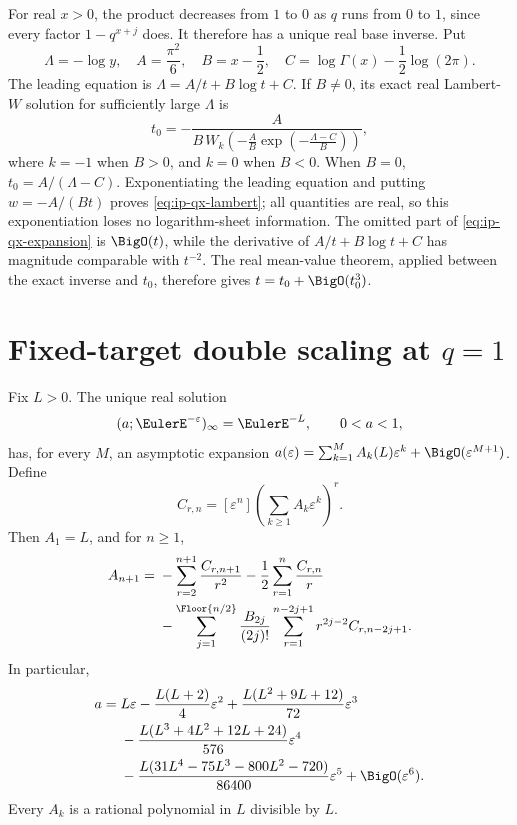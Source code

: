 For real \(x>0\), the product decreases from \(1\) to \(0\) as \(q\) runs from
\(0\) to \(1\), since every factor \(1-q^{x+j}\) does.  It therefore has a
unique real base inverse.  Put
\[
 \Lambda=-\log y,\quad A=\frac{\pi^2}{6},\quad
 B=x-\frac12,\quad C=\log\Gamma(x)-\frac12\log(2\pi).
\]
The leading equation is \(\Lambda=A/t+B\log t+C\).  If \(B\ne0\), its exact
real Lambert-\(W\) solution for sufficiently large \(\Lambda\) is
\begin{equation}
 t_0=-\frac{A}
 {B\,W_k\!\left(-\frac AB
 \exp\left(-\frac{\Lambda-C}{B}\right)\right)},
 \label{eq:ip-qx-lambert}
\end{equation}
where \(k=-1\) when \(B>0\), and \(k=0\) when \(B<0\).
When \(B=0\), \(t_0=A/(\Lambda-C)\).  Exponentiating the leading equation and
putting \(w=-A/(Bt)\) proves \cref{eq:ip-qx-lambert}; all quantities are real,
so this exponentiation loses no logarithm-sheet information.  The omitted
part of \cref{eq:ip-qx-expansion} is \(\BigO(t)\), while the derivative of
\(A/t+B\log t+C\) has magnitude comparable with \(t^{-2}\).  The real
mean-value theorem, applied between the exact inverse and \(t_0\), therefore
gives \(t=t_0+\BigO(t_0^3)\).

\section{Fixed-target double scaling at \(q=1\)}
\label{sec:ip-double-scaling}

\begin{theorem}
\label{thm:ip-double-scaling}
Fix \(L>0\).  The unique real solution
\[
 (a;\EulerE^{-\varepsilon})_\infty=\EulerE^{-L},\qquad 0<a<1,
\]
has, for every \(M\), an asymptotic expansion
\(a(\varepsilon)=\sum_{k=1}^{M}A_k(L)\varepsilon^k+
\BigO(\varepsilon^{M+1})\).  Define
\[
 C_{r,n}=[\varepsilon^n]
 \left(\sum_{k\geq1}A_k\varepsilon^k\right)^r.
\]
Then \(A_1=L\), and for \(n\geq1\),
\begin{align}
 A_{n+1}={}&-\sum_{r=2}^{n+1}\frac{C_{r,n+1}}{r^2}
 -\frac12\sum_{r=1}^{n}\frac{C_{r,n}}r \notag\\
 &-\sum_{j=1}^{\Floor{n/2}}
 \frac{B_{2j}}{(2j)!}
 \sum_{r=1}^{n-2j+1}r^{2j-2}C_{r,n-2j+1}.
 \label{eq:ip-double-scaling-recurrence}
\end{align}
In particular,
\begin{align}
 a={}&L\varepsilon-\frac{L(L+2)}4\varepsilon^2
 +\frac{L(L^2+9L+12)}{72}\varepsilon^3 \notag\\
 &-\frac{L(L^3+4L^2+12L+24)}{576}\varepsilon^4 \notag\\
 &-\frac{L(31L^4-75L^3-800L^2-720)}
 {86400}\varepsilon^5+\BigO(\varepsilon^6).
 \label{eq:ip-double-scaling-five}
\end{align}
Every \(A_k\) is a rational polynomial in \(L\) divisible by \(L\).
\end{theorem}

